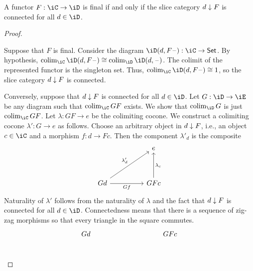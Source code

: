 \documentclass{zett}
\begin{document}
\begin{lem}
  A functor $F : \iC \to \iD$ is final if and only if the slice category $d \downarrow F$ is connected for all $d \in \iD$.
\end{lem}
\begin{proof}
  \begin{node}
    Suppose that $F$ is final.
    Consider the diagram $\iD(d, F\blank) : \iC \to \CSet$.
    By hypothesis, $\colim_{\iC}\iD(d, F\blank) \iso \colim_{\iD}\iD(d, \blank)$.
    The colimit of the represented functor is the singleton set.
    Thus, $\colim_{\iC}\iD(d, F\blank) \iso 1$, so the slice category $d \downarrow F$ is connected.
  \end{node}
  \begin{node}
    Conversely, suppose that $d \downarrow F$ is connected for all $d \in \iD$.
    Let $G : \iD \to \iE$ be any diagram such that $\colim_{\iC}GF$ exists.
    We show that $\colim_{\iD}G$ is just $\colim_{\iC}GF$.
    Let $\lambda : GF \to e$ be the colimiting cocone.
    We construct a colimiting cocone $\lambda' : G \to e$ as follows.
    Choose an arbitrary object in $d \downarrow F$, i.e., an object $c \in \iC$ and a morphism $f : d \to Fc$.
    Then the component $\lambda'_{d}$ is the composite
    \[
      \begin{tikzcd}
	&& e \\
	\\
	Gd && GFc
	\arrow["Gf"', from=3-1, to=3-3]
	\arrow["{\lambda_{c}}"', from=3-3, to=1-3]
	\arrow["{\lambda'_{d}}", from=3-1, to=1-3]
      \end{tikzcd}
    \]
    Naturality of $\lambda'$ follows from the naturality of $\lambda$ and the fact that $d \downarrow F$ is connected for all $d \in \iD$.
    Connectedness means that there is a sequence of zig-zag morphisms so that every triangle in the square commutes.
    \[
      \begin{tikzcd}
	Gd &&&& GFc \\

\end{tikzcd}\]
\end{node}
\end{proof}
\end{document}
